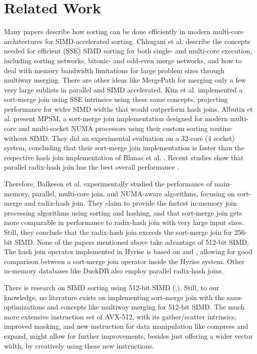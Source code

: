 \section{Related Work}
\label{sec:related-work}


Many papers describe how sorting can be done efficiently in modern multi-core architectures for
SIMD-accelerated sorting. Chhugani et al. \cite{10.14778/1454159.1454171} describe the concepts 
needed for efficient (SSE) SIMD sorting for both single- and multi-core execution, including sorting
networks, bitonic- and odd-even merge networks, and how to deal with memory bandwidth limitations 
for large problem sizes through multiway merging. There are other ideas like MergePath \cite{MergePath}
for merging only a few very large sublists in parallel and SIMD accelerated.
Kim et al. \cite{10.14778/1687553.1687564} implemented a sort-merge join using SSE intrinsics using these same 
concepts, projecting performance for wider SIMD widths that would outperform hash joins. Albutiu 
et al. \cite{MPSM} present MPSM, a sort-merge join implementation designed for modern multi-core and
multi-socket NUMA processors using their custom sorting routine without SIMD. They did an
experimental evaluation on a 32-core (4 socket) system, concluding that their sort-merge join
implementation is faster than the respective hash join implementation of Blanas et al. \cite{10.1145/1989323.1989328}. 
Recent studies show that parallel radix-hash join has the best overall performance \cite{6544839}.

Therefore,
Balkesen et al. \cite{Balkesen} experimentally studied the performance of main-memory, parallel,
multi-core join, and NUMA-aware algorithms, focusing on sort-merge and radix-hash join.
They claim to provide the fastest in-memory join processing algorithms using sorting and hashing,
and that sort-merge join gets more comparable in performance to radix-hash join with very large 
input sizes. Still, they conclude that the radix-hash join exceeds the sort-merge join for 256-bit
SIMD. None of the papers mentioned above take advantage of 512-bit SIMD. The hash join operator
implemented in Hyrise is based on \cite{6544839} and \cite{Balkesen}, allowing for good comparison
between a sort-merge join operator inside the Hyrise system. Other in-memory databases like DuckDB 
also employ parallel radix-hash joins.

There is research on SIMD
sorting using 512-bit SIMD (\cite{Watkins},\cite{8855628}). Still, to our knowledge, no literature 
exists on implementing sort-merge join with the same optimizations and concepts like
multiway merging for 512-bit SIMD.
The much more extensive instruction set of AVX-512, with its gather/scatter intrinsics, improved
masking, and new instruction for data manipulation like compress and expand, might allow for
further improvements, besides just offering a wider vector width, by creatively using these new
instructions.
